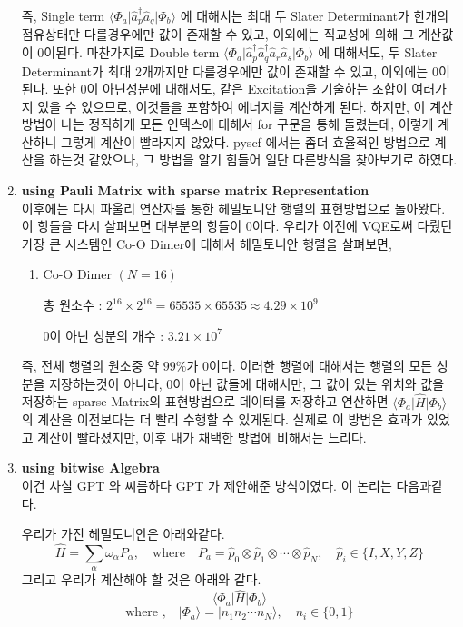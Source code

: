 \documentclass[11pt]{article}
\begin{document}
\begin{enumerate}
  즉, Single term \(\langle \Phi_a \vert \hat{a}_p^\dagger \hat{a}_q  \vert \Phi_b \rangle \) 에 대해서는 
  최대 두 Slater Determinant가 한개의 점유상태만 다를경우에만 값이 존재할 수 있고, 이외에는 직교성에 의해 그 계산값이 0이된다. 
  마찬가지로 Double term \(\langle \Phi_a \vert \hat{a}_p^\dagger \hat{a}_q^\dagger \hat{a}_r \hat{a}_s \vert \Phi_b \rangle\) 에 대해서도,
  두 Slater Determinant가 최대 2개까지만 다를경우에만 값이 존재할 수 있고, 이외에는 0이된다. 
  또한 0이 아닌성분에 대해서도, 같은 Excitation을 기술하는 조합이 여러가지 있을 수 있으므로, 이것들을 포함하여 에너지를 계산하게 된다. 
  하지만, 이 계산방법이 나는 정직하게 모든 인덱스에 대해서 for 구문을 통해 돌렸는데, 이렇게 계산하니 그렇게 계산이 빨라지지 않았다. pyscf 에서는 좀더 효율적인 방법으로 계산을 하는것 같았으나, 
  그 방법을 알기 힘들어 일단 다른방식을 찾아보기로 하였다. 

  \item \textbf{using Pauli Matrix with sparse matrix Representation}\\
  이후에는 다시 파울리 연산자를 통한 헤밀토니안 행렬의 표현방법으로 돌아왔다. 이 항들을 다시 살펴보면 대부분의 항들이 0이다. 우리가 이전에 VQE로써 다뤘던 가장 큰 시스템인 Co-O Dimer에 대해서 헤밀토니안 행렬을 살펴보면, 
  \begin{enumerate}[label=\(Ex.\)]
  \item {Co-O Dimer \(\left(N=16\right)\)}
  
  총 원소수 : \(2^{16} \times 2^{16} = 65535 \times 65535 \approx 4.29\times 10^{9}\) 

  0이 아닌 성분의 개수 : \(3.21 \times 10^{7}\)   
  \end{enumerate}
  즉, 전체 행렬의 원소중 약 \(99 \% \)가 0이다. 
  이러한 행렬에 대해서는 행렬의 모든 성분을 저장하는것이 아니라, 0이 아닌 값들에 대해서만, 그 값이 있는 위치와 값을 저장하는 sparse Matrix의 표현방법으로 데이터를 저장하고 연산하면 
  \(\langle \Phi_a \vert \hat{H} \vert \Phi_b \rangle\)의 계산을 이전보다는 더 빨리 수행할 수 있게된다. 
  실제로 이 방법은 효과가 있었고 계산이 빨라졌지만, 이후 내가 채택한 방법에 비해서는 느리다. 

  \item \textbf{using bitwise Algebra}\\
  이건 사실 GPT 와 씨름하다 GPT 가 제안해준 방식이였다. 이 논리는 다음과같다.
  
  우리가 가진 헤밀토니안은 아래와같다. 
  \[
  \hat{H} = \sum_{\alpha} \omega_{\alpha} P_{\alpha}, \quad \text{where} \quad
  P_a = \hat{p}_0 \otimes \hat{p}_1 \otimes \cdots \otimes \hat{p}_N, \quad
  \hat{p}_i \in \{I, X, Y, Z\}
  \]
  그리고 우리가 계산해야 할 것은 아래와 같다. 
  \[
  \langle \Phi_a \vert \hat{H} \vert \Phi_b \rangle 
  \]
  \[\text{where ,} \quad \vert \Phi_a \rangle = \vert n_1 n_2\cdots n_N \rangle ,\quad n_i \in \{0,1\}\]


\end{enumerate}
\end{document}
